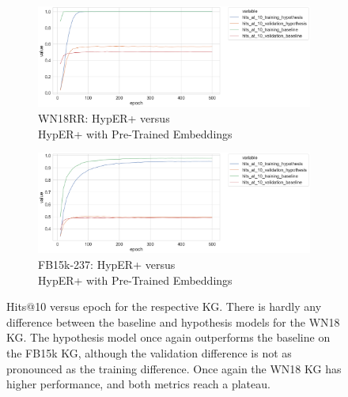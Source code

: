 \begin{figure}[H]
	\begin{subfigure}[b]{.5\linewidth}
   		\centering
    		\includegraphics[width=1.0\linewidth, height=0.6\linewidth]{WN18RR_hits_at_10_Results_ptwv}
		\captionsetup{justification=centering}
		\caption{WN18RR: HypER+ versus \\ HypER+ with Pre-Trained Embeddings}
	\end{subfigure}
	\begin{subfigure}[b]{.5\linewidth}
   		\centering
		\includegraphics[width=1.0\linewidth, height=0.6\linewidth]{FB15k-237_hits_at_10_Results_ptwv}
		\captionsetup{justification=centering}
		\caption{FB15k-237: HypER+ versus \\ HypER+ with Pre-Trained Embeddings}
	\end{subfigure}
	\captionsetup{justification=centering}
	\caption{Hits@10 versus epoch for the respective KG. There is hardly any difference between the baseline and hypothesis models for the WN18 KG. The hypothesis model once again outperforms the baseline on the FB15k KG, although the validation difference is not as pronounced as the training difference. Once again the WN18 KG has higher performance, and both metrics reach a plateau.}
\end{figure}


